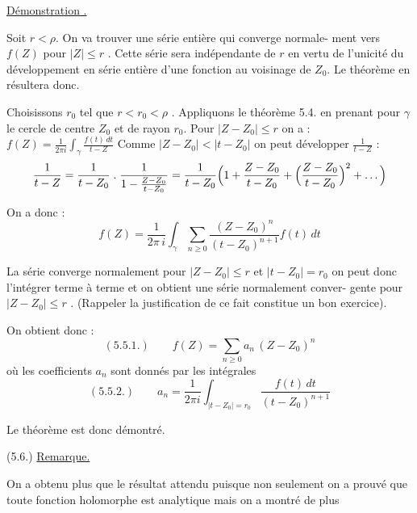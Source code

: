 
\uline{Démonstration .}

Soit \( r < \rho \). On va trouver une série entière qui converge normale-%
ment vers \( f(Z) \) pour \( |Z| \leq r \) . Cette série sera indépendante de \( r \) en vertu
de l'unicité du développement en série entière d'une fonction au voisinage de
\( Z_0 \). Le théorème en résultera donc.

Choisissons \( r_0 \) tel que \( r < r_0 < \rho \) . Appliquons le théorème 5.4.
en prenant pour \( \gamma \) le cercle de centre \( Z_0 \) et de rayon \( r_0 \). Pour \( |Z-Z_0| \leq r \)
on a : \( f(Z) = \frac{1}{2 \pi i} \int_{\gamma} \frac{f(t)\, dt}{t - Z} \)
Comme \( |Z-Z_0| < |t-Z_0| \) on peut développer \( \frac{1}{t - Z} \) :
\[ \frac{1}{t - Z} = \frac{1}{t - Z_0} \;.\; \frac{1}{1 - \frac{Z-Z_0}{t-Z_0}} = \frac{1}{t - Z_0} \Bigl( 1 + \frac{Z - Z_0}{t - Z_0} + \Bigl( \frac{Z - Z_0}{t - Z_0} \Bigr)^2 + \dots \Bigr) \]

On a donc :
\[ f(Z) = \frac{1}{2 \pi \, i} \int_{\gamma} \sum_{n \geq 0} \frac{(Z-Z_0)^n}{(t-Z_0)^{n+1}} f(t)\, dt \]

La série converge normalement pour \( |Z - Z_0| \leq r \) et \( |t - Z_0| = r_0 \) on
peut donc l'intégrer terme à terme et on obtient une série normalement conver-%
gente pour \( |Z - Z_0| \leq r \) . (Rappeler la justification de ce fait constitue
un bon exercice).

On obtient donc :
\[ (5.5.1.) \qquad f(Z) = \sum_{n \geq 0} a_n \, (Z - Z_0)^n \]
où les coefficients \( a_n \) sont donnés par les intégrales
\[ (5.5.2.) \qquad a_n = \frac{1}{2 \pi i} \int_{|t-Z_0| = r_0} \frac{f(t)\, dt}{(t-Z_0)^{n+1}} \]

Le théorème est donc démontré.

(5.6.) \uline{Remarque.}

On a obtenu plus que le résultat attendu puisque non seulement on
a prouvé que toute fonction holomorphe est analytique mais on a montré de plus

